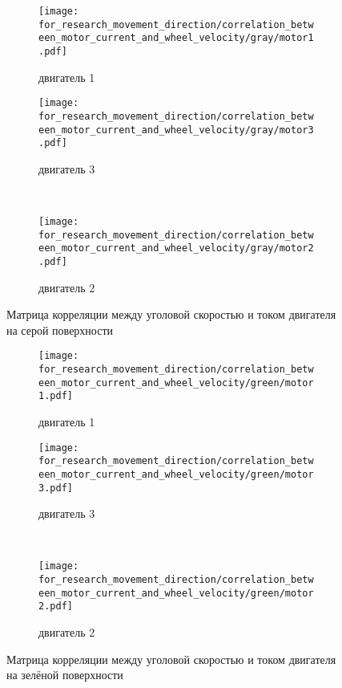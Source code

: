 \begin{figure}[H]
    \centering
    \begin{subfigure}{0.49\textwidth}
        \centering
        \texttt{[image: for\_research\_movement\_direction/correlation\_between\_motor\_current\_and\_wheel\_velocity/gray/motor1.pdf]}
        \caption{двигатель 1}
    \end{subfigure}
    \hspace{0.005\textwidth}
    \begin{subfigure}{0.49\textwidth}
        \centering
        \texttt{[image: for\_research\_movement\_direction/correlation\_between\_motor\_current\_and\_wheel\_velocity/gray/motor3.pdf]}
        \caption{двигатель 3}
    \end{subfigure} \\
    \vspace{4pt}
    \centering
    \begin{subfigure}{0.49\textwidth}
        \centering
        \texttt{[image: for\_research\_movement\_direction/correlation\_between\_motor\_current\_and\_wheel\_velocity/gray/motor2.pdf]}
        \caption{двигатель 2}
    \end{subfigure}
    \caption{Матрица корреляции между уголовой скоростью и током двигателя на серой поверхности}
\end{figure}

\begin{figure}[H]
    \centering
    \begin{subfigure}{0.49\textwidth}
        \centering
        \texttt{[image: for\_research\_movement\_direction/correlation\_between\_motor\_current\_and\_wheel\_velocity/green/motor1.pdf]}
        \caption{двигатель 1}
    \end{subfigure}
    \hspace{0.005\textwidth}
    \begin{subfigure}{0.49\textwidth}
        \centering
        \texttt{[image: for\_research\_movement\_direction/correlation\_between\_motor\_current\_and\_wheel\_velocity/green/motor3.pdf]}
        \caption{двигатель 3}
    \end{subfigure} \\
    \vspace{4pt}
    \centering
    \begin{subfigure}{0.49\textwidth}
        \centering
        \texttt{[image: for\_research\_movement\_direction/correlation\_between\_motor\_current\_and\_wheel\_velocity/green/motor2.pdf]}
        \caption{двигатель 2}
    \end{subfigure}
    \caption{Матрица корреляции между уголовой скоростью и током двигателя на зелёной поверхности}
\end{figure}

